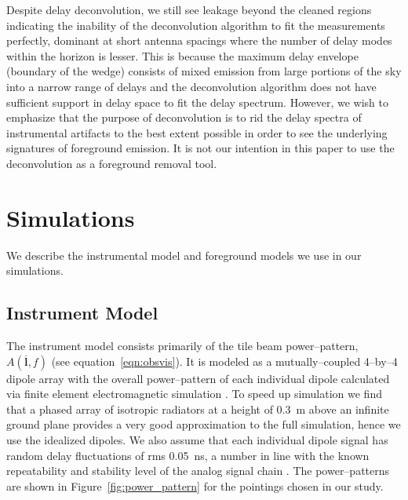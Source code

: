 \documentclass[preprint2,iop,numberedappendix]{emulateapj}
\begin{document}
Despite delay deconvolution, we still see leakage beyond the cleaned regions indicating the inability of the deconvolution algorithm to fit the measurements perfectly, dominant at short antenna spacings where the number of delay modes within the horizon is lesser. This is because the maximum delay envelope (boundary of the wedge) consists of mixed emission from large portions of the sky into a narrow range of delays and the deconvolution algorithm does not have sufficient support in delay space to fit the delay spectrum. However, we wish to emphasize that the purpose of deconvolution is to rid the delay spectra of instrumental artifacts to the best extent possible in order to see the underlying signatures of foreground emission. It is not our intention in this paper to use the deconvolution as a foreground removal tool. 

\section{Simulations}\label{sec:modeling}

We describe the instrumental model and foreground models we use in our simulations. 

\subsection{Instrument Model}\label{sec:instrument_model}

The instrument model consists primarily of the tile beam power--pattern, $A(\overline{\mathbf{l}},f)$ (see equation~\ref{eqn:obsvis}). It is modeled as a mutually--coupled 4--by--4 dipole array with the overall power--pattern of each individual dipole calculated via finite element electromagnetic simulation \citep{sut14}. To speed up simulation we find that a phased array of isotropic radiators at a height of 0.3~m above an infinite ground plane provides a very good approximation to the full simulation, hence we use the idealized dipoles. We also assume that each individual dipole signal has random delay fluctuations of rms 0.05~ns, a number in line with the known repeatability and stability level of the analog signal chain \citep{bow07b}. The power--patterns are shown in Figure~\ref{fig:power_pattern} for the pointings chosen in our study.
\end{document}
